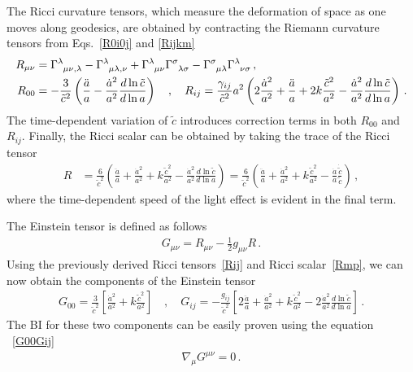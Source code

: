 \documentclass[jkps,preprint,fleqn]{revtex4} %
\newcommand{\tc}{\tilde{c}}
\begin{document}
The Ricci curvature tensors, which measure the deformation of space as one moves along geodesics, are obtained by contracting the Riemann curvature tensors from Eqs.~\eqref{R0i0j} and \eqref{Rijkm} 
\begin{align} 
R_{\mu\nu} &= \tensor{\Gamma}{^\lambda_\mu_\nu_,_\lambda} - \tensor{\Gamma}{^\lambda_\mu_\lambda_,_\nu} + \tensor{\Gamma}{^\lambda_\mu_\nu} \tensor{\Gamma}{^\sigma_\lambda_\sigma} - \tensor{\Gamma}{^\sigma_\mu_\lambda} \tensor{\Gamma}{^\lambda_\nu_\sigma} \label{Rmn} \,, \\ R_{00} &= -\frac{3}{\tc^2} \left( \frac{\ddot{a}}{a} - \frac{\dot{a}^2}{a^2} \frac{d \ln \tc}{ d \ln a}  \right) \quad , \quad R_{ij} = \frac{\gamma_{ij}}{\tc^2} a^2 \left( 2 \frac{\dot{a}^2}{a^2} + \frac{\ddot{a}}{a} + 2 k \frac{\tc^2}{a^2} - \frac{\dot{a}^2}{a^2} \frac{d \ln \tc}{ d \ln a}  \right) \label{Rij} \,. \end{align} 
The time-dependent variation of $\tc$ introduces correction terms in both $R_{00}$ and $R_{ij}$.
Finally, the Ricci scalar can be obtained by taking the trace of the Ricci tensor 
\begin{align} R &= \frac{6}{\tc^2} \left( \frac{\ddot{a}}{a} + \frac{\dot{a}^2}{a^2} + k \frac{\tc^2}{a^2} - \frac{\dot{a}^2}{a^2} \frac{d \ln \tc}{ d \ln a}  \right) =  \frac{6}{\tc^2} \left( \frac{\ddot{a}}{a} + \frac{\dot{a}^2}{a^2} + k \frac{\tc^2}{a^2} - \frac{\dot{a}}{a} \frac{\dot{\tc}}{\tc}  \right)  \label{Rmp} \,, \end{align} 
where the time-dependent speed of the light effect is evident in the final term.

The Einstein tensor is defined as follows
\begin{align}
G_{\mu\nu} = R_{\mu\nu} - \frac{1}{2} g_{\mu\nu} R \label{Gmunu} \,.
\end{align}
Using the previously derived Ricci tensors~\eqref{Rij} and Ricci scalar~\eqref{Rmp}, we can now obtain the components of the Einstein tensor
\begin{align}
G_{00} = \frac{3}{\tc^2} \left[ \frac{\dot{a}^2}{a^2} + k \frac{\tc^2}{a^2} \right] \quad , \quad G_{ij} = -\frac{g_{ij}}{\tc^2} \left[ 2 \frac{\ddot{a}}{a} + \frac{\dot{a}^2}{a^2} + k \frac{\tc^2}{a^2} - 2 \frac{\dot{a}^2}{a^2} \frac{d \ln \tc}{d \ln a} \right] \,. \label{G00Gij}
\end{align}
The BI for these two components can be easily proven using the equation ~\eqref{G00Gij}
\begin{align}
\nabla_{\mu} G^{\mu \nu} = 0 \label{nablaGmunu} \,.
\end{align}
\end{document}
